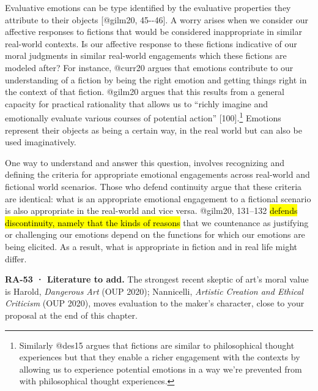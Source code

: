 \documentclass[
  letterpaper,
  DIV=11,
  numbers=noendperiod]{scrartcl}
\theoremstyle{remark}
\begin{document}
Evaluative emotions can be type identified by the evaluative properties
they attribute to their objects {[}@gilm20, 45-\/-46{]}. A worry arises
when we consider our affective responses to fictions that would be
considered inappropriate in similar real-world contexts. Is our
affective response to these fictions indicative of our moral judgments
in similar real-world engagements which these fictions are modeled
after? For instance, @curr20 argues that emotions contribute to our
understanding of a fiction by being the right emotion and getting things
right in the context of that fiction. @gilm20 argues that this results
from a general capacity for practical rationality that allows us to
``richly imagine and emotionally evaluate various courses of potential
action'' {[}100{]}.\footnote{Similarly @des15 argues that fictions are
  similar to philosophical thought experiences but that they enable a
  richer engagement with the contexts by allowing us to experience
  potential emotions in a way we're prevented from with philosophical
  thought experiences.} Emotions represent their objects as being a
certain way, in the real world but can also be used imaginatively.

One way to understand and answer this question, involves recognizing and
defining the criteria for appropriate emotional engagements across
real-world and fictional world scenarios. Those who defend continuity
argue that these criteria are identical: what is an appropriate
emotional engagement to a fictional scenario is also appropriate in the
real-world and vice versa. @gilm20, 131--132 \hl{defends discontinuity,
namely that the kinds of reasons} that we countenance as justifying or
challenging our emotions depend on the functions for which our emotions
are being elicited. As a result, what is appropriate in fiction and in
real life might differ.

\begin{tcolorbox}[enhanced jigsaw, arc=.35mm, bottomrule=.15mm, bottomtitle=1mm, breakable, colback=white, colbacktitle=quarto-callout-tip-color!10!white, colframe=quarto-callout-tip-color-frame, coltitle=black, left=2mm, leftrule=.75mm, opacityback=0, opacitybacktitle=0.6, rightrule=.15mm, title=\textcolor{quarto-callout-tip-color}{\faLightbulb}\hspace{0.5em}{Tip}, titlerule=0mm, toprule=.15mm, toptitle=1mm]

\textbf{RA-53 · Literature to add.} The strongest recent skeptic of
art's moral value is Harold, \emph{Dangerous Art} (OUP 2020);
Nannicelli, \emph{Artistic Creation and Ethical Criticism} (OUP 2020),
moves evaluation to the maker's character, close to your proposal at the
end of this chapter.

\end{tcolorbox}
\end{document}
